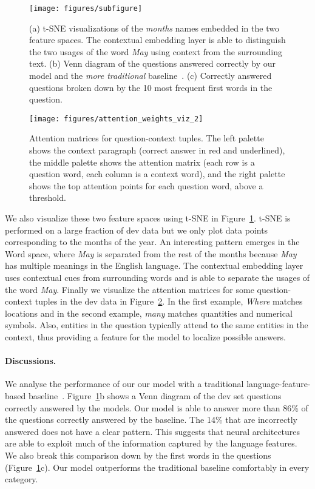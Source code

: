 \documentclass{article} \usepackage{iclr2017_conference,times}
\begin{document}
\begin{figure}[t]
\centering
\texttt{[image: figures/subfigure]}
\caption{\small (a) t-SNE visualizations of the \textit{months} names embedded in the two feature spaces. The contextual embedding layer is able to distinguish the two usages of the word \textit{May} using context from the surrounding text. (b) Venn diagram of the questions answered correctly by our model and the \textit{more traditional} baseline~\citep{rajpurkar2016squad}. (c) Correctly answered questions broken down by the 10 most frequent first words in the question.}
\label{fig:tsne}
\end{figure}

\begin{figure}[]
\centering
\texttt{[image: figures/attention\_weights\_viz\_2]}
\caption{\small Attention matrices for question-context tuples. The left palette shows the context paragraph (correct answer in red and underlined), the middle palette shows the attention matrix (each row is a question word, each column is a context word), and the right palette shows the top attention points for each question word, above a threshold.}
\label{fig:viz_attention}
\end{figure}

We also visualize these two feature spaces using t-SNE in Figure~\ref{fig:tsne}. t-SNE is performed on a large fraction of dev data but we only plot data points corresponding to the months of the year. 
An interesting pattern emerges in the Word space, where \textit{May} is separated from the rest of the months because \textit{May} has multiple meanings in the English language. 
The contextual embedding layer uses contextual cues from surrounding words and is able to separate the usages of the word \textit{May}. Finally we visualize the attention matrices for some question-context tuples in the dev data in Figure~\ref{fig:viz_attention}. In the first example, \textit{Where} matches locations and in the second example, \textit{many} matches quantities and numerical symbols. Also, entities in the question typically attend to the same entities in the context, thus providing a feature for the model to localize possible answers.



\paragraph{Discussions.} We analyse the performance of our our model with a traditional language-feature-based baseline~\citep{rajpurkar2016squad}. Figure~\ref{fig:tsne}b shows a Venn diagram of the dev set questions correctly answered by the models. Our model is able to answer more than 86\% of the questions correctly answered by the baseline. The 14\% that are incorrectly answered does not have a clear pattern. 
This suggests that neural architectures are able to exploit much of the information captured by the language features. 
We also break this comparison down by the first words in the questions (Figure~\ref{fig:tsne}c). Our model outperforms the traditional baseline comfortably in every category.
\end{document}
